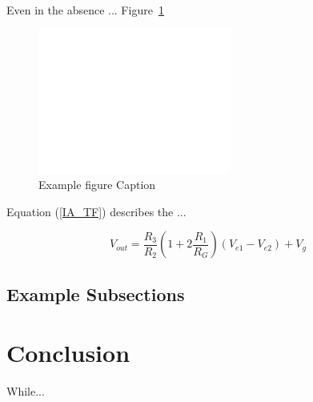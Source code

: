 \documentclass[conference]{../templates/IEEEtran}
\begin{document}
	Even in the absence ... Figure~\ref{myfig}
	
	\begin{figure}[!b] %
		\centering
		\includegraphics[width=2.5in,draft]{temp}
		\caption{Example figure Caption}
		\label{myfig}
	\end{figure}
	
	Equation (\ref{IA_TF}) describes the ...
	
	\begin{equation}
		V_{out} = \frac{R_3}{R_2}\left(1+2\frac{R_1}{R_G}\right)(V_{e1}-V_{e2})+V_g
		\label{IA_TF}
	\end{equation}
	
	\newpage %
	
	\subsection{Example Subsections}
	
	\section{Conclusion} %
	
	While...
	
	\clearpage
	\nocite{*} %
	
	
\end{document}
